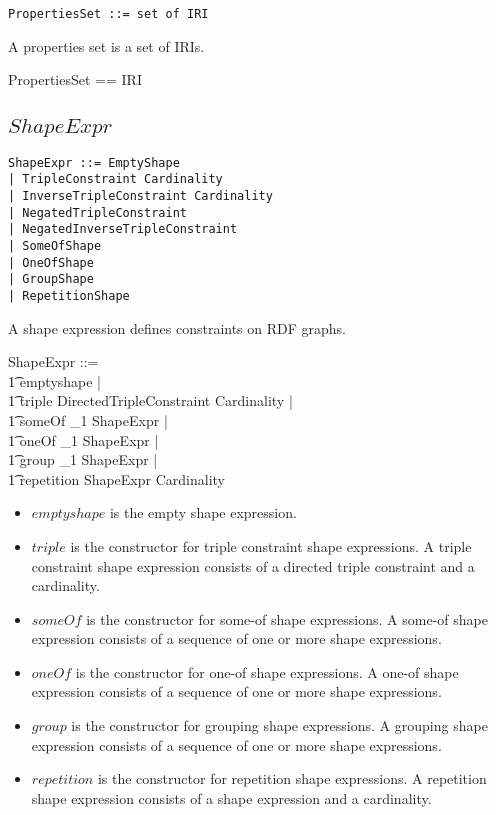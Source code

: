 \documentclass{article}
\begin{document}
\begin{verbatim}
PropertiesSet ::= set of IRI
\end{verbatim}

A properties set is a set of IRIs.
\begin{zed}
	PropertiesSet == \power IRI
\end{zed}

\subsection{$ShapeExpr$}

\begin{verbatim}
ShapeExpr ::= EmptyShape
| TripleConstraint Cardinality
| InverseTripleConstraint Cardinality
| NegatedTripleConstraint
| NegatedInverseTripleConstraint
| SomeOfShape
| OneOfShape
| GroupShape
| RepetitionShape
\end{verbatim}

A shape expression defines constraints on RDF graphs.
\begin{zed}
	ShapeExpr ::= \\
\t1		emptyshape | \\
\t1		triple \ldata DirectedTripleConstraint \cross Cardinality \rdata | \\
\t1		someOf \ldata \seq_1 ShapeExpr \rdata | \\
\t1		oneOf \ldata \seq_1 ShapeExpr \rdata | \\
\t1		group \ldata \seq_1 ShapeExpr \rdata | \\
\t1		repetition \ldata ShapeExpr \cross Cardinality \rdata
\end{zed}
\begin{itemize}
\item $emptyshape$ is the empty shape expression.
\item $triple$ is the constructor for triple constraint shape expressions. 
A triple constraint shape expression consists of a directed triple constraint and a cardinality.
\item $someOf$ is the constructor for some-of shape expressions.
A some-of shape expression consists of a sequence of one or more shape expressions.
\item $oneOf$ is the constructor for one-of shape expressions.
A one-of shape expression consists of a sequence of one or more shape expressions.
\item $group$ is the constructor for grouping shape expressions.
A grouping shape expression consists of a sequence of one or more shape expressions.
\item $repetition$ is the constructor for repetition shape expressions.
A repetition shape expression consists of a shape expression and a cardinality.
\end{itemize}
\end{document}
